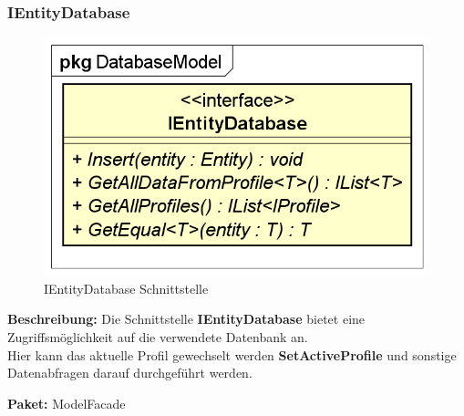 \documentclass[a4paper]{scrreprt}
\begin{document}
\subsubsection{IEntityDatabase}
\begin{figure}[H]
\centering
\includegraphics[width=0.45\textheight]{graphics/Klassendiagramme/Model/IEntityDatabase.png}
\caption{IEntityDatabase Schnittstelle}
\end{figure}
\textbf{Beschreibung:} Die Schnittstelle \textbf{IEntityDatabase} bietet eine Zugriffsmöglichkeit auf die verwendete Datenbank an.\\
Hier kann das aktuelle Profil gewechselt werden \textbf{SetActiveProfile} und sonstige Datenabfragen darauf durchgeführt werden.

\textbf{Paket:} ModelFacade
\end{document}
